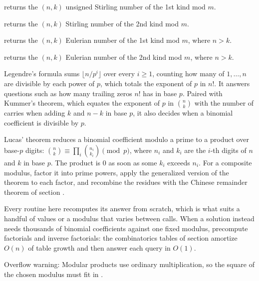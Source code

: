 \begin{compactitem}
  \item {} returns the $(n, k)$ unsigned Stirling number of the 1st kind mod $m$.
  \item {} returns the $(n, k)$ Stirling number of the 2nd kind mod $m$.
  \item {} returns the $(n, k)$ Eulerian number of the 1st kind mod $m$, where $n > k$.
  \item {} returns the $(n, k)$ Eulerian number of the 2nd kind mod $m$, where $n > k$.
\end{compactitem}

Legendre's formula sums $\lfloor n/p^i \rfloor$ over every $i \geq 1$, counting how many of $1, \dots, n$ are divisible by each power of $p$, which totals the exponent of $p$ in $n!$. It answers questions such as how many trailing zeros $n!$ has in base $p$. Paired with Kummer's theorem, which equates the exponent of $p$ in $\binom{n}{k}$ with the number of carries when adding $k$ and $n - k$ in base $p$, it also decides when a binomial coefficient is divisible by $p$.

Lucas' theorem reduces a binomial coefficient modulo a prime to a product over base-$p$ digits: $\binom{n}{k} \equiv \prod_i \binom{n_i}{k_i} \pmod p$, where $n_i$ and $k_i$ are the $i$-th digits of $n$ and $k$ in base $p$. The product is $0$ as soon as some $k_i$ exceeds $n_i$. For a composite modulus, factor it into prime powers, apply the generalized version of the theorem to each factor, and recombine the residues with the Chinese remainder theorem of section .

Every routine here recomputes its answer from scratch, which is what suits a handful of values or a modulus that varies between calls. When a solution instead needs thousands of binomial coefficients against one fixed modulus, precompute factorials and inverse factorials: the combinatorics tables of section  amortize $O(n)$ of table growth and then answer each query in $O(1)$.

Overflow warning: Modular products use ordinary  multiplication, so the square of the chosen modulus must fit in .

